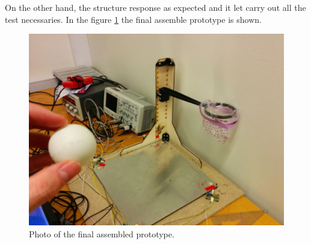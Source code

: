 		On the other hand, the structure response as expected and it let carry out all the test necessaries. In the figure \ref{fig:photo1} the final assemble prototype is shown.

		\begin{figure}[tb]
			\begin{center}
				\includegraphics[width=.8\textwidth]{figures/photo1}
			\end{center}
			\caption{Photo of the final assembled prototype.}
			\label{fig:photo1}
		\end{figure}
